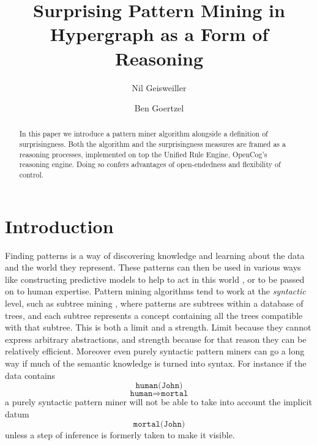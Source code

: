 \documentclass[runningheads]{llncs}
\begin{document}
%
\title{Surprising Pattern Mining in Hypergraph as a Form of Reasoning}
%
%
\author{Nil Geisweiller \and
Ben Goertzel}
%
%
%
\maketitle              %
%

\begin{abstract}
  In this paper we introduce a pattern miner algorithm alongside a
  definition of surprisingness. Both the algorithm and the
  surprisingness measures are framed as a reasoning processes,
  implemented on top the Unified Rule Engine, OpenCog's reasoning
  engine. Doing so confers advantages of open-endedness and
  flexibility of control. 
\end{abstract}

\section{Introduction}

Finding patterns is a way of discovering knowledge and learning about
the data and the world they represent. These patterns can then be used
in various ways like constructing predictive models to help to act in
this world \cite{Jade12Pat}, or to be passed on to human
expertise. Pattern mining algorithms tend to work at the
\emph{syntactic} level, such as subtree mining \cite{Chi2005Freq},
where patterns are subtrees within a database of trees, and each
subtree represents a concept containing all the trees compatible with
that subtree. This is both a limit and a strength. Limit because they
cannot express arbitrary abstractions, and strength because for that
reason they can be relatively efficient. Moreover even purely
syntactic pattern miners can go a long way if much of the semantic
knowledge is turned into syntax. For instance if the data contains
$$\texttt{human(John)}$$
$$\texttt{human}\Rightarrow\texttt{mortal}$$ a purely syntactic
pattern miner will not be able to take into account the implicit
datum $$\texttt{mortal(John)}$$ unless a step of inference is formerly
taken to make it visible.
\end{document}
